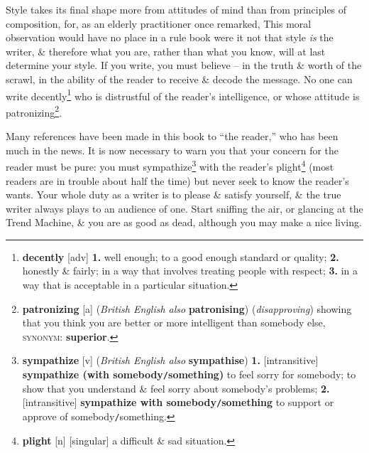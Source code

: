 \documentclass[oneside]{book}
\numberwithin{equation}{section}
\begin{document}
Style takes its final shape more from attitudes of mind than from principles of composition, for, as an elderly practitioner once remarked,  This moral observation would have no place in a rule book were it not that style \textit{is} the writer, \& therefore what you are, rather than what you know, will at last determine your style. If you write, you must believe -- in the truth \& worth of the scrawl, in the ability of the reader to receive \& decode the message. No one can write decently\footnote{\textbf{decently} [adv] \textbf{1.} well enough; to a good enough standard or quality; \textbf{2.} honestly \& fairly; in a way that involves treating people with respect; \textbf{3.} in a way that is acceptable in a particular situation.} who is distrustful of the reader's intelligence, or whose attitude is patronizing\footnote{\textbf{patronizing} [a] (\textit{British English also} \textbf{patronising}) (\textit{disapproving}) showing that you think you are better or more intelligent than somebody else, \textsc{synonym}: \textbf{superior}.}.

Many references have been made in this book to ``the reader,'' who has been much in the news. It is now necessary to warn you that your concern for the reader must be pure: you must sympathize\footnote{\textbf{sympathize} [v] (\textit{British English also} \textbf{sympathise}) \textbf{1.} [intransitive] \textbf{sympathize (with somebody\texttt{/}something)} to feel sorry for somebody; to show that you understand \& feel sorry about somebody's problems; \textbf{2.} [intransitive] \textbf{sympathize with somebody\texttt{/}something} to support or approve of somebody\texttt{/}something.} with the reader's plight\footnote{\textbf{plight} [n] [singular] a difficult \& sad situation.} (most readers are in trouble about half the time) but never seek to know the reader's wants. Your whole duty as a writer is to please \& satisfy yourself, \& the true writer always plays to an audience of one. Start sniffing the air, or glancing at the Trend Machine, \& you are as good as dead, although you may make a nice living.
\end{document}

